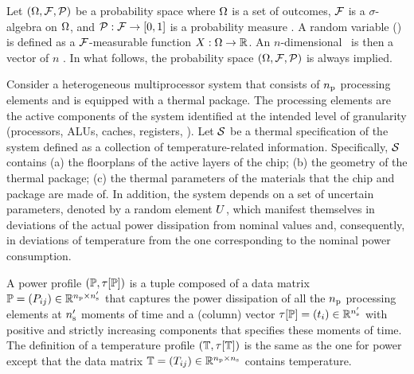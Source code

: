 Let $(\Omega, \mathcal{F}, \mathcal{P})$ be a probability space where $\Omega$ is a set of outcomes, $\mathcal{F}$ is a $\sigma$-algebra on $\Omega$, and $\mathcal{P}: \mathcal{F} \to [0, 1]$ is a probability measure \cite{durrett2010}. A random variable (\rv) is defined as a $\mathcal{F}$-measurable function $X: \Omega \to \mathbb{R}$. An $n$-dimensional \rv\ is then a vector of $n$ \rvs. In what follows, the probability space $(\Omega, \mathcal{F}, \mathcal{P})$ is always implied.

Consider a heterogeneous multiprocessor system that consists of ${n_\text{p}}$ processing elements and is equipped with a thermal package. The processing elements are the active components of the system identified at the intended level of granularity (processors, ALUs, caches, registers, \etc). Let $\mathcal{S}$ be a thermal specification of the system defined as a collection of temperature-related information. Specifically, $\mathcal{S}$ contains (a) the floorplans of the active layers of the chip; (b) the geometry of the thermal package; (c) the thermal parameters of the materials that the chip and package are made of. In addition, the system depends on a set of uncertain parameters, denoted by a random element $U$, which manifest themselves in deviations of the actual power dissipation from nominal values and, consequently, in deviations of temperature from the one corresponding to the nominal power consumption.

A power profile $\profileP$ is a tuple composed of a data matrix $\mathbb{P} = (P_{ij}) \in \mathbb{R}^{{n_\text{p}} \times {n_\text{s}'}}$ that captures the power dissipation of all the ${n_\text{p}}$ processing elements at ${n_\text{s}'}$ moments of time and a (column) vector $\tau[\mathbb{P}] = (t_i) \in \mathbb{R}^{{n_\text{s}'}}$ with positive and strictly increasing components that specifies these moments of time. The definition of a temperature profile $\profileT$ is the same as the one for power except that the data matrix $\mathbb{T} = (T_{ij}) \in \mathbb{R}^{{n_\text{p}} \times {n_\text{s}}}$ contains temperature.

